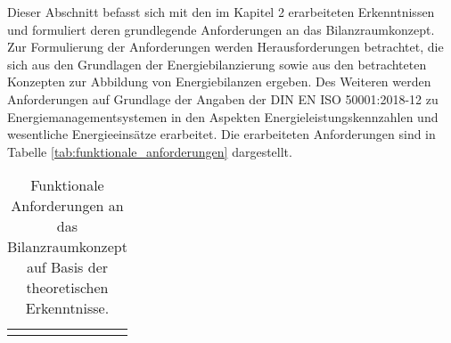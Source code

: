 Dieser Abschnitt befasst sich mit den im Kapitel 2 erarbeiteten Erkenntnissen und formuliert deren grundlegende Anforderungen an das Bilanzraumkonzept.  
Zur Formulierung der Anforderungen werden Herausforderungen betrachtet, die sich aus den Grundlagen der Energiebilanzierung sowie aus den betrachteten Konzepten zur Abbildung von Energiebilanzen ergeben.  
Des Weiteren werden Anforderungen auf Grundlage der Angaben der DIN EN ISO 50001:2018-12 zu Energiemanagementsystemen in den Aspekten  
Energieleistungskennzahlen und wesentliche Energieeinsätze erarbeitet.  
Die erarbeiteten Anforderungen sind in Tabelle \eqref{tab:funktionale_anforderungen} dargestellt.

\begin{longtable}{| m{} | m{} | m{} | m{} |}
    \caption{Funktionale Anforderungen an das Bilanzraumkonzept auf Basis der theoretischen Erkenntnisse.} \\
    \label{tab:funktionale_anforderungen} \\ 
    

\end{longtable}
